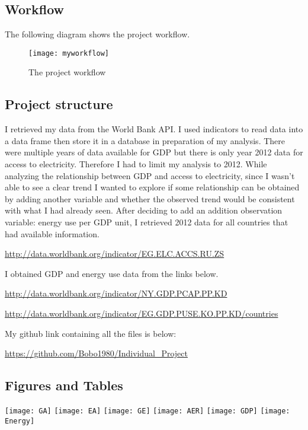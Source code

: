 \documentclass{article}
\begin{document}
\subsection{Workflow}

The following diagram shows the project workflow.

\begin{figure}[hb]
  \centering
    \texttt{[image: myworkflow]}
  \caption{The project workflow}

\end{figure}




\subsection{Project structure}

I retrieved my data from the World Bank API. I used indicators to read data into a data frame then store it in a database in preparation of my analysis. There were multiple years of data available for GDP but there is only year 2012 data for access to electricity. Therefore I had to limit my analysis to 2012. While analyzing the relationship between GDP and access to electricity, since I wasn’t able to see a clear trend I wanted to explore if some relationship can be obtained by adding another variable and whether the observed trend would be consistent with what I had already seen. After deciding to add an addition observation variable: energy use per GDP unit, I retrieved 2012 data for all countries that had available information.

\url{http://data.worldbank.org/indicator/EG.ELC.ACCS.RU.ZS}

I obtained GDP and energy use data from the links below. 

\url{http://data.worldbank.org/indicator/NY.GDP.PCAP.PP.KD}

\url{http://data.worldbank.org/indicator/EG.GDP.PUSE.KO.PP.KD/countries}

My github link containing all the files is below:

\url{https://github.com/Bobo1980/Individual_Project}

\subsection{Figures and Tables}


\texttt{[image: GA]}
\texttt{[image: EA]}
\texttt{[image: GE]}
\texttt{[image: AER]}
\texttt{[image: GDP]}
\texttt{[image: Energy]}
\end{document}
